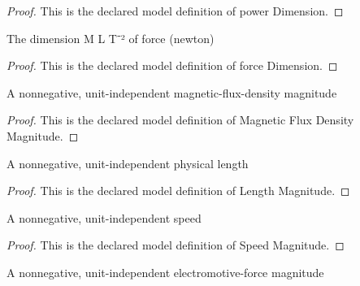 \begin{proof}
  This is the declared model definition of power Dimension.
\end{proof}
\begin{definition}
  \label{def:physics:phyx-mini-0919:phyxminiproblems-problemphyxmini0919-forcedimension}
  The dimension M L T⁻² of force (newton)
\end{definition}
\begin{proof}
  This is the declared model definition of force Dimension.
\end{proof}
\begin{definition}
  \label{def:physics:phyx-mini-0919:phyxminiproblems-problemphyxmini0919-magneticfluxdensitymagnitude}
  A nonnegative, unit-independent magnetic-flux-density magnitude
\end{definition}
\begin{proof}
  This is the declared model definition of Magnetic Flux Density Magnitude.
\end{proof}
\begin{definition}
  \label{def:physics:phyx-mini-0919:phyxminiproblems-problemphyxmini0919-lengthmagnitude}
  A nonnegative, unit-independent physical length
\end{definition}
\begin{proof}
  This is the declared model definition of Length Magnitude.
\end{proof}
\begin{definition}
  \label{def:physics:phyx-mini-0919:phyxminiproblems-problemphyxmini0919-speedmagnitude}
  A nonnegative, unit-independent speed
\end{definition}
\begin{proof}
  This is the declared model definition of Speed Magnitude.
\end{proof}
\begin{definition}
  \label{def:physics:phyx-mini-0919:phyxminiproblems-problemphyxmini0919-electromotiveforcemagnitude}
  A nonnegative, unit-independent electromotive-force magnitude
\end{definition}
